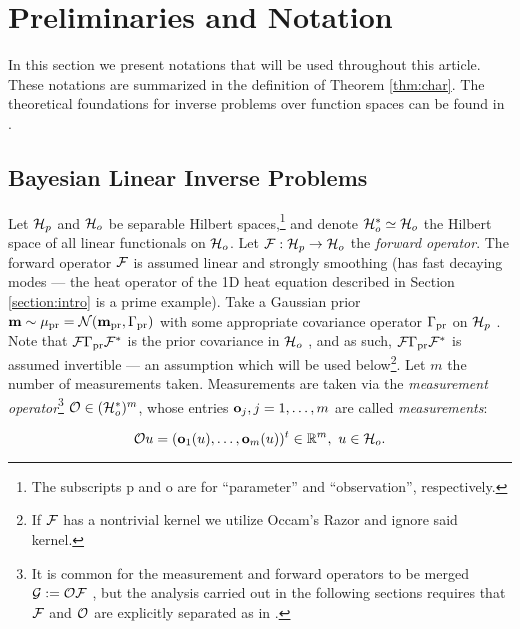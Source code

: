 \section{Preliminaries and Notation}\label{section:prelim}

In this section we present notations that will be used throughout this
article. These notations are summarized in the definition of Theorem \ref{thm:char}. The theoretical foundations for inverse
problems over function spaces can be found in \cite{Stuart10}.


\subsection{Bayesian Linear Inverse Problems}\label{subsec:abstract OED}
Let $\mathcal{H}_p$ and $\mathcal{H}_o$ be separable Hilbert spaces,\footnote{The
subscripts p and o are for ``parameter'' and ``observation'',
respectively.} and denote $\mathcal{H}_o^* \simeq \mathcal{H}_o$ the Hilbert space of
all linear functionals on $\mathcal{H}_o$. Let $\mathcal{F}: \mathcal{H}_p \to \mathcal{H}_o$ the
\emph{forward operator}. The forward operator $\mathcal{F}$ is assumed linear
and strongly smoothing (has fast decaying modes --- the heat operator
of the 1D heat equation described in Section \ref{section:intro} is a
prime example). Take a Gaussian prior $\mathbf{m} \sim \mu_{\textup{pr}} =
\mathcal{N}(\mathbf{m}_{\textup{pr}} ,\Gamma_{\textup{pr}})$ with some appropriate covariance operator
$\Gamma_{\textup{pr}}$ on $\mathcal{H}_p$ \cite{Stuart10}. Note that $\mathcal{F} \Gamma_{\textup{pr}} \mathcal{F}^*$ is
the prior covariance in $\mathcal{H}_o$ \cite{Stuart10}, and as such, $\mathcal{F}
\Gamma_{\textup{pr}} \mathcal{F}^*$ is assumed invertible --- an assumption which will be
used below\footnote{If $\mathcal{F}$ has a nontrivial kernel we utilize
Occam's Razor and ignore said kernel.}. Let $m$ the number of
measurements taken. Measurements are taken via the \emph{measurement
operator}\footnote{It is common for the measurement and forward
operators to be merged $\mathcal{G} := \mathcal{O} \mathcal{F}$
\cite{AlexanderianGloorGhattas14}, but the analysis carried out in the
following sections requires that $\mathcal{F}$ and $\mathcal{O}$ are explicitly
separated as in \cite{attia2022stochastic, cvetkovic2023choosing}.}
$\mathcal{O} \in ( \mathcal{H}_o^* )^m$, whose entries $\mathbf{o}_j, j=1,\dots,m$ are
called \emph{measurements}:

\begin{equation*}%
  \obs u = (\meas_1(u), \dots, \meas_m(u) )^t \in \R^m,\ u \in \hilo.
\end{equation*}
%
%


